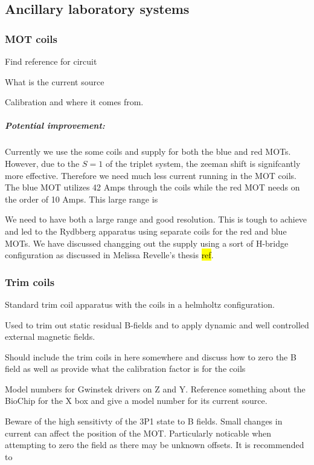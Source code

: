 \subsection{Ancillary laboratory systems} \label{ssec:misc_sys}

\subsubsection{MOT coils}

Find reference for circuit

What is the current source

Calibration and where it comes from.

\subparagraph{Potential improvement:}
Currently we use the some coils and supply for both the blue and red MOTs.
However, due to the $S=1$ of the triplet system, the zeeman shift is signifcantly more effective.
Therefore we need much less current running in the MOT coils.
The blue MOT utilizes 42 Amps through the coils while the red MOT needs on the order of 10 Amps.
This large range is 

We need to have both a large range and good resolution.
This is tough to achieve and led to the Rydbberg apparatus using separate coils for the red and blue MOTs.
We have discussed changging out the supply using a sort of H-bridge configuration as discussed in Melissa Revelle's thesis \hl{ref}.

\subsubsection{Trim coils}

Standard trim coil apparatus with the coils in a helmholtz configuration.

Used to trim out static residual B-fields and to apply dynamic and well controlled external magnetic fields.

Should include the trim coils in here somewhere and discuss how to zero the B field as well as provide what the calibration factor is for the coils

Model numbers for Gwinstek drivers on Z and Y. Reference something about the BioChip for the X box and give a model number for its current source.

Beware of the high sensitivty of the 3P1 state to B fields. Small changes in current can affect the position of the MOT. Particularly noticable when attempting to zero the field as there may be unknown offsets. It is recommended to 

